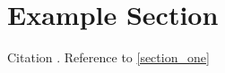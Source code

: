 \documentclass{article}
\begin{document}
\section{Example Section}\label{section_one}

Citation \cite{aharonov2008quantum}.
Reference to \autoref{section_one}

\renewcommand{\listfigurename}{}
\listoffigures

\printbibliography
\end{document}
